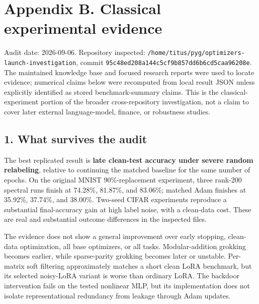 \documentclass[
  british,
  10pt,
  a4paper,
]{article}
\begin{document}
\clearpage

\section{Appendix B. Classical experimental
evidence}\label{classical-evidence}

Audit date: 2026-\allowbreak{}09-\allowbreak{}06.\allowbreak{}
Repository inspected:
\texttt{/\allowbreak{}home/\allowbreak{}titus/\allowbreak{}pyg/\allowbreak{}optimizers-\allowbreak{}launch-\allowbreak{}investigatio\allowbreak{}n},
commit
\texttt{95c48ed208a1\allowbreak{}44c5cf9b857d\allowbreak{}d6b6cd5caa96\allowbreak{}208e}.
The maintained knowledge base and focused research reports were used to
locate evidence; numerical claims below were recomputed from local
result JSON unless explicitly identified as stored
benchmark-\allowbreak{}summary claims. This is the
classical-\allowbreak{}experiment portion of the broader
cross-\allowbreak{}repository investigatio\allowbreak{}n,\allowbreak{}
not a claim to cover later external
language-\allowbreak{}model,\allowbreak{} finance, or robustness
studies.

\subsection{1. What survives the
audit}\label{classical-evidence--what-survives-the-audit}

The best replicated result is \textbf{late clean-test accuracy under
severe random relabeling}, relative to continuing the matched baseline
for the same number of epochs. On the original MNIST
90\%-\allowbreak{}replacement experiment,\allowbreak{} three rank-200
spectral runs finish at 74.28\%, 81.87\%, and 83.06\%; matched Adam
finishes at 35.92\%, 37.74\%, and 38.00\%. Two-seed CIFAR experiments
reproduce a substantial final-\allowbreak{}accuracy gain at high label
noise, with a clean-data cost. These are real and substantial outcome
differences in the inspected files.

The evidence does not show a general improvement over early stopping,
clean-data optimization\allowbreak{},\allowbreak{} all base
optimizers,\allowbreak{} or all tasks. Modular-\allowbreak{}addition
grokking becomes earlier, while sparse-\allowbreak{}parity grokking
becomes later or unstable. Per-matrix soft filtering approximately
matches a short clean LoRA benchmark, but its selected noisy-LoRA
variant is worse than ordinary LoRA. The backdoor intervention fails on
the tested nonlinear MLP, but its implementation does not isolate
representational redundancy from leakage through Adam updates.
\end{document}
